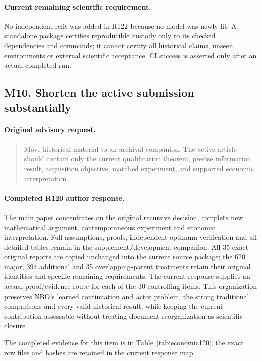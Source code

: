\paragraph{Current remaining scientific requirement.}
No independent refit was added in R122 because no model was newly fit. A standalone package certifies reproducible custody only to its checked dependencies and commands; it cannot certify all historical claims, unseen environments or external scientific acceptance. CI success is asserted only after an actual completed run.

\subsection{M10. Shorten the active submission substantially}
\label{response122:M10}

\paragraph{Original advisory request.}
\begin{quote}
Move historical material to an archival companion. The active article should contain only the current qualification theorem, precise information result, acquisition objective, matched experiment, and supported economic interpretation.
\end{quote}

\paragraph{Completed R120 author response.}
The main paper concentrates on the original recursive decision, complete new mathematical argument, contemporaneous experiment and economic interpretation. Full assumptions, proofs, independent optimum verification and all detailed tables remain in the supplement/development companion. All 35 exact original reports are copied unchanged into the current source package; the 620 major, 394 additional and 35 overlapping-parent treatments retain their original identities and specific remaining requirements. The current response supplies an actual proof/evidence route for each of the 30 controlling items. This organization preserves NBO's learned continuation and actor problem, the strong traditional comparisons and every valid historical result, while keeping the current contribution assessable without treating document reorganization as scientific closure.

The completed evidence for this item is in Table~\ref{tab:economic120}; the exact row files and hashes are retained in the current response map.

